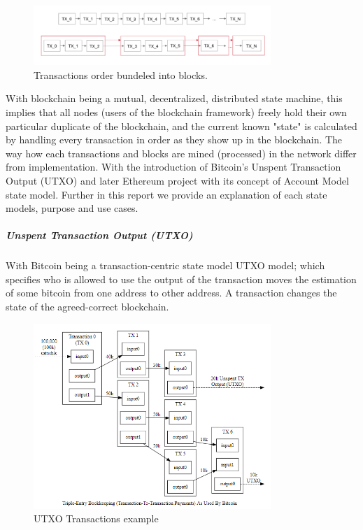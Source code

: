 \begin{figure}[h]
\centering
\includegraphics[width=0.8\textwidth]{images/transactions_blocks.png}
\caption{\label{fig:Transactions}Transactions order bundeled into blocks.}
\end{figure}


With blockchain being a mutual, decentralized, distributed state machine, this implies that all nodes (users of the blockchain framework) freely hold their own particular duplicate of the blockchain, and the current known "state" is calculated by handling every transaction in order as they show up in the blockchain. The way how each transactions and blocks are mined (processed) in the network differ from implementation. With the introduction of Bitcoin’s Unspent Transaction Output (UTXO) and later Ethereum project with its concept of Account Model state model. Further in this report we provide an explanation of each state models, purpose and use cases.

\subparagraph{Unspent Transaction Output (UTXO)}

With Bitcoin being a transaction-centric state model UTXO model; which specifies who is allowed to use the output of the transaction moves the estimation of some bitcoin from one address to other address. A transaction changes the state of the agreed-correct blockchain. 

\begin{figure}[h]
\centering
\includegraphics[width=0.8\textwidth]{images/UTXO.png}
\caption{\label{fig:UTXO}UTXO Transactions example}
\end{figure}

